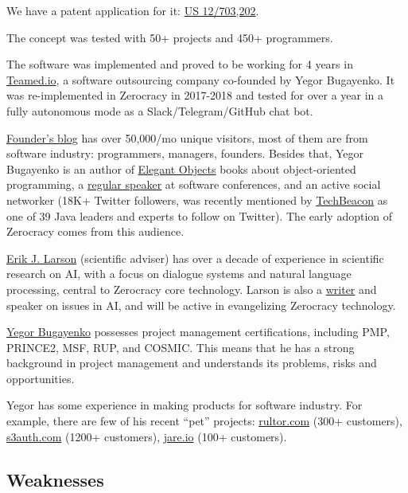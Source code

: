 \documentclass{main}
\begin{document}
We have a patent application for it:
\href{https://patents.google.com/patent/US20110196798}{US 12/703,202}.

The concept was tested with 50+ projects and 450+ programmers.

The software was implemented and proved to be working for 4 years in
\href{http://www.teamed.io}{Teamed.io},
a software outsourcing company co-founded by Yegor Bugayenko.
It was re-implemented in Zerocracy in 2017-2018 and tested for over a year
in a fully autonomous mode as a Slack/Telegram/GitHub chat bot.

\href{http://www.yegor256.com}{Founder's blog} has over 50,000/mo unique visitors, most of them are from
software industry: programmers, managers, founders. Besides that, Yegor
Bugayenko is an author of \href{https://amzn.to/2bYXQy7}{Elegant Objects} books about object-oriented
programming, a \href{https://lanyrd.com/profile/yegor256/}{regular speaker} at software conferences, and an active social
networker (18K+ Twitter followers, was recently mentioned by \href{https://techbeacon.com/java-leaders-you-should-follow-twitter}{TechBeacon} as one
of 39 Java leaders and experts to follow on Twitter). The
early adoption of Zerocracy comes from this audience.

\href{https://www.linkedin.com/in/erik-larson-b287ba9}{Erik J. Larson} (scientific adviser) has over a decade of experience in
scientific research on AI, with a focus on dialogue systems and natural language
processing, central to Zerocracy core technology. Larson is also a
\href{https://www.theatlantic.com/technology/archive/2015/05/the-humanists-paradox/391622/}{writer} and
speaker on issues in AI, and will be active in evangelizing Zerocracy
technology.

\href{http://www.yegor256.com/about-me.html}{Yegor Bugayenko} possesses project management certifications, including PMP,
PRINCE2, MSF, RUP, and COSMIC. This means that he has a strong background in
project management and understands its problems, risks and opportunities.

Yegor has some experience in making products for software industry. For example,
there are few of his recent ``pet'' projects:
\href{http://www.rultor.com}{rultor.com} (300+ customers),
\href{http://www.s3auth.com}{s3auth.com} (1200+ customers),
\href{http://www.jare.io}{jare.io} (100+ customers).

\subsection{Weaknesses}
\end{document}

